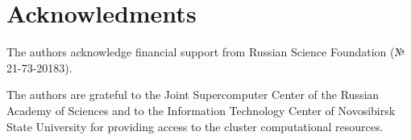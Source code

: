 \documentclass[a4paperm]{article}
\begin{document}
\section*{Acknowledments}
The authors acknowledge financial support from Russian Science Foundation (№ 21-73-20183).

The authors are grateful to the Joint Supercomputer Center of the Russian Academy of Sciences and to the Information Technology Center of Novosibirsk State University for providing access to the cluster computational resources.



\end{document}
